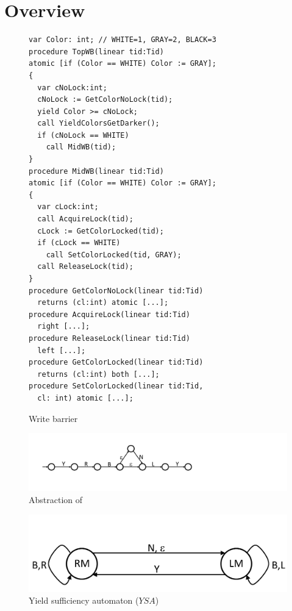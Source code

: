 \section{Overview}
\label{sec:overview}

\begin{figure} 
\begin{verbatim}
var Color: int; // WHITE=1, GRAY=2, BLACK=3
procedure TopWB(linear tid:Tid)
atomic [if (Color == WHITE) Color := GRAY];
{
  var cNoLock:int;
  cNoLock := GetColorNoLock(tid);
  yield Color >= cNoLock;
  call YieldColorsGetDarker(); 
  if (cNoLock == WHITE) 
    call MidWB(tid);
}
procedure MidWB(linear tid:Tid)
atomic [if (Color == WHITE) Color := GRAY];
{
  var cLock:int;
  call AcquireLock(tid);
  cLock := GetColorLocked(tid);
  if (cLock == WHITE) 
    call SetColorLocked(tid, GRAY);
  call ReleaseLock(tid);
}
procedure GetColorNoLock(linear tid:Tid) 
  returns (cl:int) atomic [...];
procedure AcquireLock(linear tid:Tid) 
  right [...];
procedure ReleaseLock(linear tid:Tid) 
  left [...];
procedure GetColorLocked(linear tid:Tid) 
  returns (cl:int) both [...];
procedure SetColorLocked(linear tid:Tid, 
  cl: int) atomic [...];
\end{verbatim}
\caption{Write barrier}
\label{fig:reft}
\end{figure}

\begin{figure}
\begin{center}
\includegraphics[scale=0.35]{MidWB.pdf}
\end{center}
\caption{Abstraction of }
\label{fig:midwb}
\end{figure}

\begin{figure}
\begin{center}
\includegraphics[scale=0.35]{YieldTypeCheckingAutomaton.pdf}
\end{center}
\caption{Yield sufficiency automaton ($YSA$)}
\label{fig:ysa}
\end{figure}

